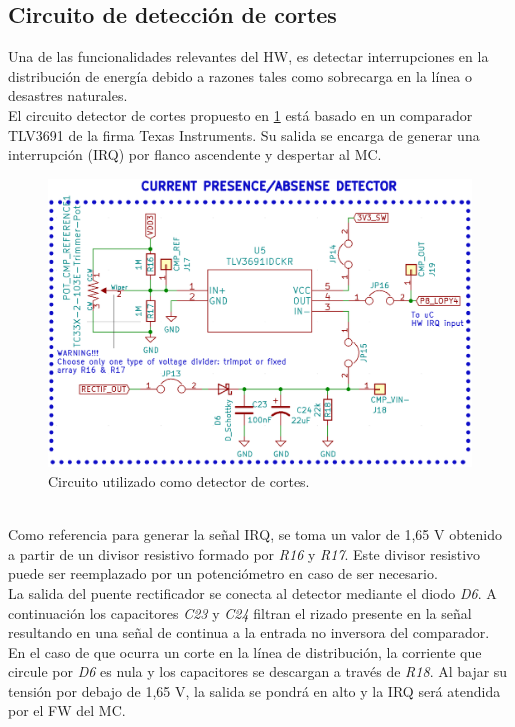  \subsection{Circuito de detección de cortes}
 Una de las funcionalidades relevantes del HW, es detectar interrupciones en la distribución de energía debido a razones tales como sobrecarga en la línea o desastres naturales.\\
 El circuito detector de cortes propuesto en \ref{fig:ctodetectorcortes} está basado en un comparador TLV3691 de la firma Texas Instruments. Su salida se encarga de generar una interrupción (IRQ) por flanco ascendente y despertar al MC.\\
 \begin{figure}[h]
 	\centering
 	\includegraphics[width=0.7\linewidth]{Figures/cto_detector_cortes}
 	\caption{Circuito utilizado como detector de cortes.}
 	\label{fig:ctodetectorcortes}
 \end{figure}\\
 Como referencia para generar la señal IRQ, se toma un valor de 1,65 V obtenido a partir de un divisor resistivo formado por \textit{R16} y \textit{R17}. Este divisor resistivo puede ser reemplazado por un potenciómetro en caso de ser necesario.\\
 La salida del puente rectificador se conecta al detector mediante el diodo \textit{D6}. A continuación los capacitores \textit{C23} y \textit{C24} filtran el rizado presente en la señal resultando en una señal de continua a la entrada no inversora del comparador.\\
 En el caso de que ocurra un corte en la línea de distribución, la corriente que circule por \textit{D6} es nula y los capacitores se descargan a través de \textit{R18}. Al bajar su tensión por debajo de 1,65 V, la salida se pondrá en alto y la IRQ será atendida por el FW del MC.\\
 
